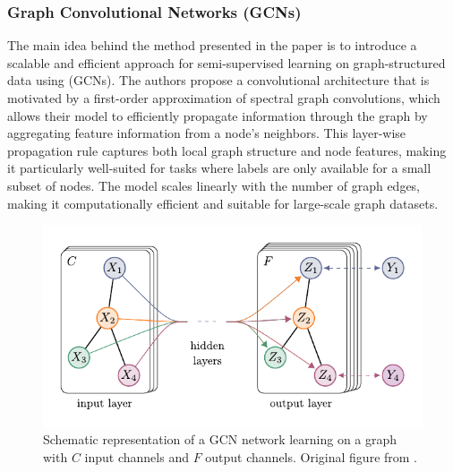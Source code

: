\subsubsection{Graph Convolutional Networks (GCNs)}

The main idea behind the method presented in the paper \cite{kipf_semi-supervised_2017} is to introduce a scalable and efficient approach for semi-supervised learning on graph-structured data using  (GCNs). The authors propose a convolutional architecture that is motivated by a first-order approximation of spectral graph convolutions, which allows their model to efficiently propagate information through the graph by aggregating feature information from a node's neighbors. This layer-wise propagation rule captures both local graph structure and node features, making it particularly well-suited for tasks where labels are only available for a small subset of nodes. The model scales linearly with the number of graph edges, making it computationally efficient and suitable for large-scale graph datasets.

\begin{figure}
	\includegraphics[width=0.8\linewidth]{images/GCN.pdf}
	\caption{Schematic representation of a GCN network learning on a graph with \( C \) input channels and \( F \) output channels. Original figure from \cite{kipf_semi-supervised_2017}.}
	\label{fig:GCN}
\end{figure}

